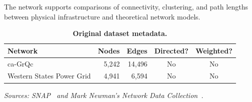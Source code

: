 The network supports comparisons of connectivity, clustering, and path lengths between physical infrastructure and theoretical network models.

\begin{table}[htbp]
\centering
\caption{\textbf{Original dataset metadata.}}
\label{tab:dataset-metadata}
\begin{tabularx}{\linewidth}{@{}Xrrcc@{}}
\toprule
Network & Nodes & Edges & Directed? & Weighted? \\
\midrule
ca-GrQc & 5,242 & 14,496 & No & No \\
Western States Power Grid & 4,941 & 6,594 & No & No \\
\bottomrule
\end{tabularx}
\par\smallskip
\begin{minipage}{\linewidth}
\textit{Sources: SNAP~\cite{snap-ca-grqc} and Mark Newman's Network Data Collection~\cite{newman-power-grid}.}
\end{minipage}
\end{table}
